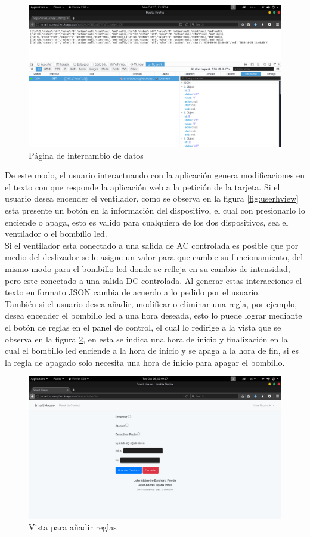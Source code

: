 \begin{figure}[H]
	\centering
	\caption{Página de intercambio de datos}
	\label{fig:updateview}
	\includegraphics[width=0.7\linewidth]{Imagenes/Update_view}
\end{figure}

De este modo, el usuario interactuando con la aplicación genera modificaciones en el texto con que responde la aplicación web a la petición de la tarjeta. Si el usuario desea encender el ventilador, como se observa en la figura \ref{fig:userhview} esta presente un botón en la información del dispositivo, el cual con presionarlo lo enciende o apaga, esto es valido para cualquiera de los dos dispositivos, sea el ventilador o el bombillo led.\\

Si el ventilador esta conectado a una salida de AC controlada es posible que por medio del deslizador se le asigne un valor para que cambie su funcionamiento, del mismo modo para el bombillo led donde se refleja en su cambio de intensidad, pero este conectado a una salida DC controlada. Al generar estas interacciones el texto en formato JSON cambia de acuerdo a lo pedido por el usuario.\\ 

También si el usuario desea añadir, modificar o eliminar una regla, por ejemplo, desea encender el bombillo led a una hora deseada, esto lo puede lograr mediante el botón de reglas en el panel de control, el cual lo redirige a la vista que se observa en la figura \ref{fig:rulesview}, en esta se indica una hora de inicio y finalización en la cual el bombillo led enciende a la hora de inicio y se apaga a la hora de fin, si es la regla de apagado solo necesita una hora de inicio para apagar el bombillo.

\begin{figure}[H]
	\centering
	\caption{Vista para añadir reglas}
	\label{fig:rulesview}
	\includegraphics[width=0.6\linewidth]{Imagenes/rules_view}
\end{figure}

